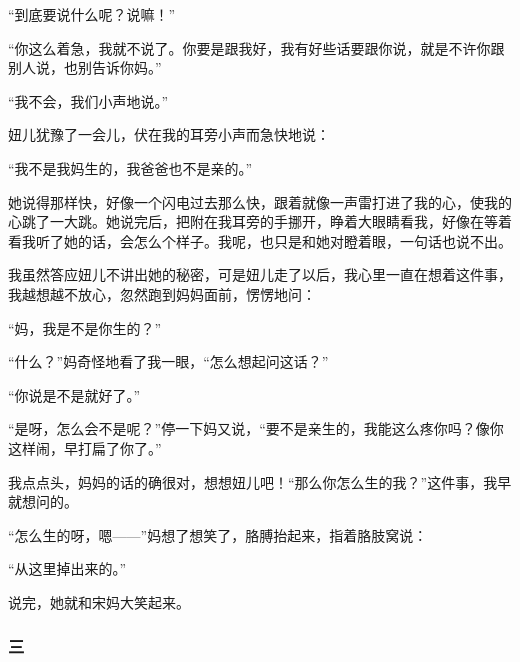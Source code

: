 \par “到底要说什么呢？说嘛！”
\par “你这么着急，我就不说了。你要是跟我好，我有好些话要跟你说，就是不许你跟别人说，也别告诉你妈。”
\par “我不会，我们小声地说。”
\par 妞儿犹豫了一会儿，伏在我的耳旁小声而急快地说：
\par “我不是我妈生的，我爸爸也不是亲的。”
\par 她说得那样快，好像一个闪电过去那么快，跟着就像一声雷打进了我的心，使我的心跳了一大跳。她说完后，把附在我耳旁的手挪开，睁着大眼睛看我，好像在等着看我听了她的话，会怎么个样子。我呢，也只是和她对瞪着眼，一句话也说不出。
\par 我虽然答应妞儿不讲出她的秘密，可是妞儿走了以后，我心里一直在想着这件事，我越想越不放心，忽然跑到妈妈面前，愣愣地问：
\par “妈，我是不是你生的？”
\par “什么？”妈奇怪地看了我一眼，“怎么想起问这话？”
\par “你说是不是就好了。”
\par “是呀，怎么会不是呢？”停一下妈又说，“要不是亲生的，我能这么疼你吗？像你这样闹，早打扁了你了。”
\par 我点点头，妈妈的话的确很对，想想妞儿吧！“那么你怎么生的我？”这件事，我早就想问的。
\par “怎么生的呀，嗯——”妈想了想笑了，胳膊抬起来，指着胳肢窝说：
\par “从这里掉出来的。”
\par 说完，她就和宋妈大笑起来。

\subsubsection*{三}

